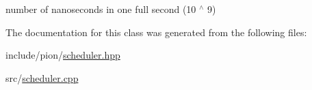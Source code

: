 number of nanoseconds in one full second (10 $^\wedge$ 9) 



The documentation for this class was generated from the following files\-:\begin{DoxyCompactItemize}
\item 
include/pion/\hyperlink{scheduler_8hpp}{scheduler.\-hpp}\item 
src/\hyperlink{scheduler_8cpp}{scheduler.\-cpp}\end{DoxyCompactItemize}
